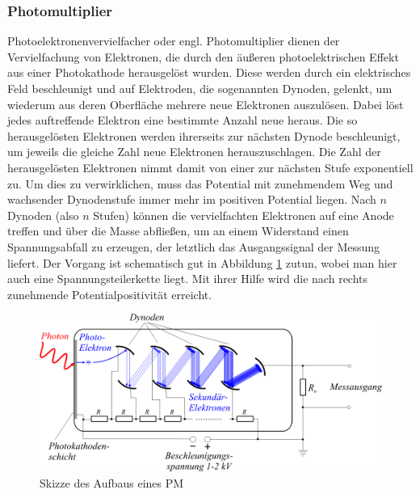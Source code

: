         \subsubsection{Photomultiplier}
            Photoelektronenvervielfacher oder engl. Photomultiplier dienen der Vervielfachung von Elektronen, die durch den äußeren photoelektrischen Effekt aus einer Photokathode herausgelöst wurden. Diese werden durch ein elektrisches Feld beschleunigt und auf Elektroden, die sogenannten Dynoden, gelenkt, um wiederum aus deren Oberfläche mehrere neue Elektronen auszulösen. Dabei löst jedes auftreffende Elektron eine bestimmte Anzahl neue heraus. Die so herausgelösten Elektronen werden ihrerseits zur nächsten Dynode beschleunigt, um jeweils die gleiche Zahl neue Elektronen herauszuschlagen. Die Zahl der herausgelösten Elektronen nimmt damit von einer zur nächsten Stufe exponentiell zu. Um dies zu verwirklichen, muss das Potential mit zunehmendem Weg und wachsender Dynodenstufe immer mehr im positiven Potential liegen. Nach $n$ Dynoden (also $n$ Stufen) können die vervielfachten Elektronen auf eine Anode treffen und über die Masse abfließen, um an einem Widerstand einen Spannungsabfall zu erzeugen, der letztlich das Ausgangssignal der Messung liefert.
            Der Vorgang ist schematisch gut in Abbildung \ref{pm} zutun, wobei man hier auch eine Spannungsteilerkette liegt. Mit ihrer Hilfe wird die nach rechts zunehmende Potentialpositivität erreicht. 
            \begin{figure}[htbp]
                \centering \includegraphics[scale=1]{pic/pm.png}
                \caption{\cite{pm} Skizze des Aufbaus eines PM}
                \label{pm}
            \end{figure}

